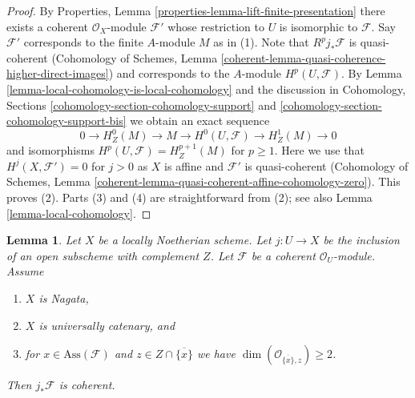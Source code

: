 \documentclass{stacks-project}
\theoremstyle{plain}
\newtheorem{lemma}[subsection]{Lemma}
\theoremstyle{definition}
\theoremstyle{remark}
\numberwithin{equation}{subsection}
\begin{document}
\begin{proof}
By Properties, Lemma \ref{properties-lemma-lift-finite-presentation}
there exists a coherent $\mathcal{O}_X$-module $\mathcal{F}'$
whose restriction to $U$ is isomorphic to $\mathcal{F}$.
Say $\mathcal{F}'$ corresponds to the finite $A$-module $M$
as in (1).
Note that $R^pj_*\mathcal{F}$ is quasi-coherent
(Cohomology of Schemes, Lemma
\ref{coherent-lemma-quasi-coherence-higher-direct-images})
and corresponds to the $A$-module $H^p(U, \mathcal{F})$.
By Lemma \ref{lemma-local-cohomology-is-local-cohomology}
and the discussion in
Cohomology, Sections \ref{cohomology-section-cohomology-support} and
\ref{cohomology-section-cohomology-support-bis}
we obtain an exact sequence
$$
0 \to H^0_Z(M) \to M \to H^0(U, \mathcal{F}) \to H^1_Z(M) \to 0
$$
and isomorphisms $H^p(U, \mathcal{F}) = H^{p + 1}_Z(M)$ for $p \geq 1$.
Here we use that $H^j(X, \mathcal{F}') = 0$ for $j > 0$ as $X$ is affine
and $\mathcal{F}'$ is quasi-coherent (Cohomology of Schemes,
Lemma \ref{coherent-lemma-quasi-coherent-affine-cohomology-zero}).
This proves (2).
Parts (3) and (4) are straightforward from (2); see also
Lemma \ref{lemma-local-cohomology}.
\end{proof}

\begin{lemma}
\label{lemma-finiteness-pushforward}
Let $X$ be a locally Noetherian scheme.
Let $j : U \to X$ be the inclusion of an
open subscheme with complement $Z$. Let $\mathcal{F}$ be a coherent
$\mathcal{O}_U$-module. Assume
\begin{enumerate}
\item $X$ is Nagata,
\item $X$ is universally catenary, and
\item for $x \in \text{Ass}(\mathcal{F})$ and
$z \in Z \cap \overline{\{x\}}$ we have
$\dim(\mathcal{O}_{\overline{\{x\}}, z}) \geq 2$.
\end{enumerate}
Then $j_*\mathcal{F}$ is coherent.
\end{lemma}
\end{document}
